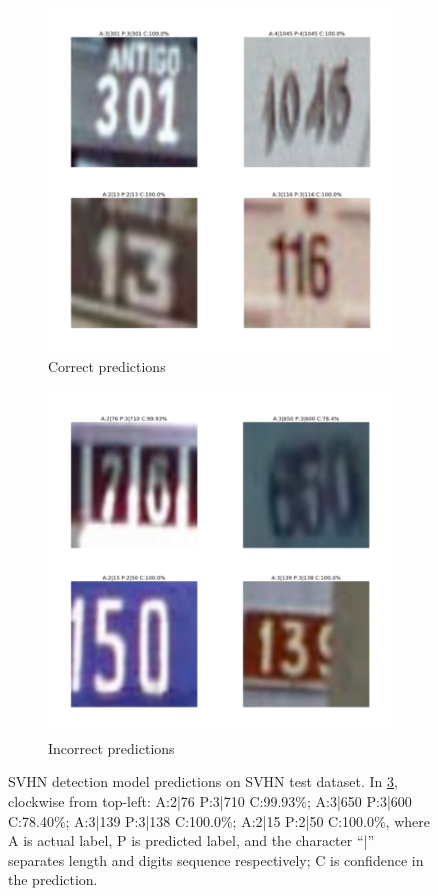 \documentclass{article}
\begin{document}
	\begin{figure}[h]
		\centering
		\begin{subfigure}[h]{0.4\textwidth}
			\centering
			\includegraphics[scale=0.4]{svhn_multi_predict_pos}
			\caption{Correct predictions}
			\label{fig:svhn_multi_predict_pos}
		\end{subfigure}
		\begin{subfigure}[h]{0.4\textwidth}
			\centering
			\includegraphics[scale=0.4]{svhn_multi_predict_neg}
			\caption{Incorrect predictions}
			\label{fig:svhn_multi_predict_neg}
		\end{subfigure}
		\caption{SVHN detection model predictions on SVHN test dataset. In \ref{fig:svhn_multi_predict_neg}, clockwise from top-left: A:2|76 P:3|710 C:99.93\%; A:3|650 P:3|600 C:78.40\%; A:3|139 P:3|138 C:100.0\%; A:2|15 P:2|50 C:100.0\%, where A is actual label, P is predicted label, and the character ``|'' separates length and digits sequence respectively; C is confidence in the prediction.}
	\end{figure}
	
\end{document}
